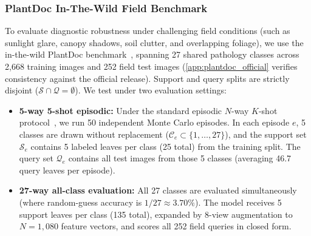 \documentclass[preprint,12pt]{elsarticle}
\begin{document}
\subsubsection{PlantDoc In-The-Wild Field Benchmark}
To evaluate diagnostic robustness under challenging field conditions (such as sunlight glare, canopy shadows, soil clutter, and overlapping foliage), we use the in-the-wild PlantDoc benchmark~\cite{singh2020plantdoc}, spanning 27 shared pathology classes across 2{,}668 training images and 252 field test images (\ref{app:plantdoc_official} verifies consistency against the official release). Support and query splits are strictly disjoint ($\mathcal{S} \cap \mathcal{Q} = \emptyset$). We test under two evaluation settings:
\begin{itemize}
    \item \textbf{5-way 5-shot episodic:} Under the standard episodic $N$-way $K$-shot protocol~\cite{snell2017prototypical}, we run 50 independent Monte Carlo episodes. In each episode $e$, 5 classes are drawn without replacement ($\mathcal{C}_e \subset \{1, \dots, 27\}$), and the support set $\mathcal{S}_e$ contains 5 labeled leaves per class (25 total) from the training split. The query set $\mathcal{Q}_e$ contains all test images from those 5 classes (averaging 46.7 query leaves per episode).
    \item \textbf{27-way all-class evaluation:} All 27 classes are evaluated simultaneously (where random-guess accuracy is $1/27 \approx 3.70\%$). The model receives 5 support leaves per class (135 total), expanded by 8-view augmentation to $N = 1{,}080$ feature vectors, and scores all 252 field queries in closed form.
\end{itemize}
\end{document}
